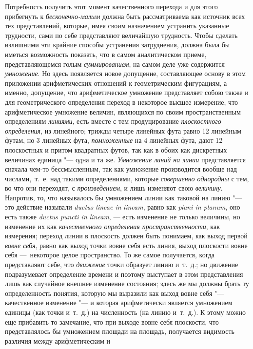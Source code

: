 Потребность получить этот момент качественного перехода и для этого
прибегнуть к {\em бесконечно-малым} должна быть
рассматриваема как источник всех тех представлений, которые, имея своим
назначением устранить указанные трудности, сами по себе представляют
величайшую трудность. Чтобы сделать излишними эти крайние способы
устранения затруднения, должна была бы иметься возможность показать, что в
самом аналитическом приеме, представляющемся голым
{\em суммированием}, на самом деле уже содержится
{\em умножение}. Но здесь появляется новое допущение,
составляющее основу в этом приложении арифметических отношений к
геометрическим фигурациям, а именно, допущение, что арифметическое
умножение представляет собою также и для геометрического определения
переход в некоторое высшее измерение, что арифметическое умножение величин,
являющихся по своим пространственным определениям
{\em линиями}, есть вместе с тем продуцирование
{\em плоскостного определения}, из линейного; трижды
четыре линейных фута равно 12 линейным футам, но 3 линейных фута,
{\em помноженные} на 4 линейных фута, дают 12
плоскостных и притом квадратных футов, так как в обоих как дискретных
величинах единица "--- одна и та же. {\em Умножение линий
на линии} представляется сначала чем-то бессмысленным, так как умножение
производится вообще над числами,~т.~е. над такими определениями, которые
{\em совершенно однородны} с тем, во что они переходят,
с {\em произведением}, и лишь изменяют свою
{\em величину}. Напротив, то, что называлось бы
умножением линии как таковой на линию "--- это действие называли
{\em ductus lineae in lineam}, равно как
{\em plani in planum}, оно есть также
{\em ductus puncti in lineam}, — есть изменение не
только величины, но изменение их как {\em качественного
определения пространственности}, как измерения; переход линии в плоскость
должен быть понимаем, как выход первой {\em вовне
себя}, равно как выход точки вовне себя есть линия, выход плоскости вовне
себя —~некоторое целое пространство. То же самое получается, когда
представляют себе, что {\em движение} точки образует
линию и~т.~д.; но движение подразумевает определение времени и поэтому
выступает в этом представления лишь как случайное внешнее изменение
состояния; здесь же мы должны брать ту определенность понятия, которую мы
выразили как выход вовне себя "--- качественное изменение "--- и которая
арифметически является умножением единицы (как точки и~т.~д.) на
численность (на линию и~т.~д.). К этому можно еще прибавить то замечание,
что при выходе вовне себя плоскости, что представлялось бы умножением
площади на площадь, получается видимость различия между арифметическим и
